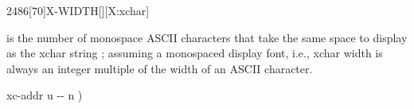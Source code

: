 \vspace*{-0.75ex}
\begin{worddef}{2486}[70]{X-WIDTH}[][X:xchar]
\item {}

	 is the number of monospace ASCII characters that take the same
	space to display as the xchar string ; assuming a
	monospaced display font, i.e., xchar width is always an integer multiple
	of the width of an ASCII character.

	\begin{implement}
	\word{:}   xc-addr u -{}- n ) \\
	    \word{+}   \\
	\tab[2]      \word{+} \\
	\tab {}  \word{-}  \word{;}
	\end{implement}
\end{worddef}



